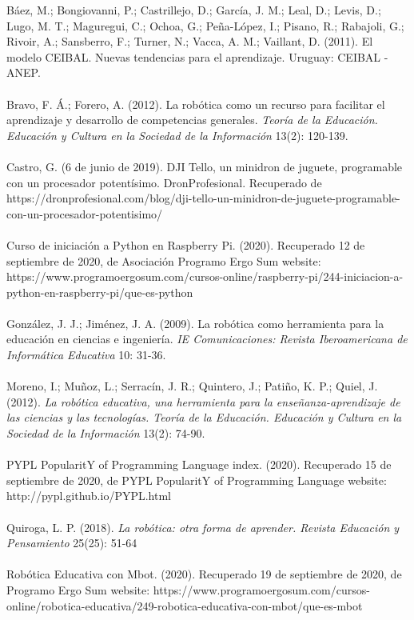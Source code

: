\documentclass{report}
\begin{document}
Báez, M.; Bongiovanni, P.; Castrillejo, D.; García, J. M.; Leal, D.; Levis, D.; Lugo, M. T.; Maguregui, C.; Ochoa, G.;  Peña-López, I.; Pisano, R.; Rabajoli, G.; Rivoir, A.; Sansberro, F.; Turner, N.; Vacca, A. M.; Vaillant, D. (2011). El modelo CEIBAL. Nuevas tendencias para el aprendizaje. Uruguay: CEIBAL - ANEP.
\\
\\
Bravo, F. Á.; Forero, A. (2012). La robótica como un recurso para facilitar el aprendizaje y desarrollo de competencias generales. \textit{Teoría de la Educación. Educación y Cultura en la Sociedad de la Información} 13(2): 120-139.
\\
\\
Castro, G. (6 de junio de 2019). DJI Tello, un minidron de juguete, programable con un procesador potentísimo. DronProfesional. Recuperado de https://dronprofesional.com/blog/dji-tello-un-minidron-de-juguete-programable-con-un-procesador-potentisimo/
\\
\\
Curso de iniciación a Python en Raspberry Pi. (2020). Recuperado 12 de septiembre de 2020, de Asociación Programo Ergo Sum website: https://www.programoergosum.com/cursos-online/raspberry-pi/244-iniciacion-a-python-en-raspberry-pi/que-es-python
\\
\\
González, J. J.; Jiménez, J. A. (2009). La robótica como herramienta para la educación en ciencias e ingeniería. \textit{IE Comunicaciones: Revista Iberoamericana de Informática Educativa} 10: 31-36.
\\
\\
Moreno, I.; Muñoz, L.; Serracín, J. R.; Quintero, J.; Patiño, K. P.; Quiel, J. (2012).\textit{ La robótica educativa, una herramienta para la enseñanza-aprendizaje de las ciencias y las tecnologías. Teoría de la Educación. Educación y Cultura en la Sociedad de la Información} 13(2): 74-90.
\\
\\
PYPL PopularitY of Programming Language index. (2020). Recuperado 15 de septiembre de 2020, de PYPL PopularitY of Programming Language website: http://pypl.github.io/PYPL.html
\\
\\
Quiroga, L. P. (2018). \textit{La robótica: otra forma de aprender. Revista Educación y Pensamiento} 25(25): 51-64
\\
\\
Robótica Educativa con Mbot. (2020). Recuperado 19 de septiembre de 2020, de Programo Ergo Sum website: https://www.programoergosum.com/cursos-online/robotica-educativa/249-robotica-educativa-con-mbot/que-es-mbot
\end{document}
